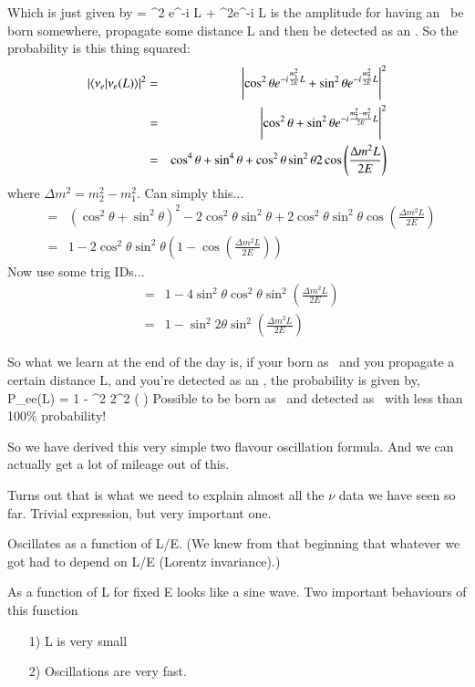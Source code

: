 {Which is just given by 
\be
{} = \cos^2 \theta e^{-i  L} + \sin^2\theta e^{-i  L} 
\ee
is the amplitude for having an \nue\ be born somewhere, propagate some distance L and then be detected as an \nue.
So the probability is this thing squared:
\begin{eqnarray*}
\left|\braket{\nu_e | \nu_e(L) }\right|^2 &=& \left|\cos^2 \theta e^{-i \frac{m_1^2}{2E} L} + \sin^2\theta e^{-i \frac{m_2^2}{2E} L} \right|^2\\
       &=& \left|\cos^2 \theta+ \sin^2\theta e^{-i \frac{m_2^2 - m_1^2}{2E} L} \right|^2\\
       &=& \cos^4 \theta+ \sin^4\theta  + \cos^2\theta \sin^2 \theta 2 \cos \left( \frac{\Delta m^2 L}{2E} \right)
\end{eqnarray*}
where $\Delta m^2 = m_2^2 - m_1^2$.
Can simply this...
\begin{eqnarray*}
 &=& \left( \cos^2 \theta + \sin^2 \theta \right)^2  - 2 \cos^2 \theta \sin^2 \theta  + 2 \cos^2 \theta \sin^2 \theta \cos \left( \frac{\Delta m^2 L}{2E} \right) \\
 &=& 1 - 2 \cos^2 \theta \sin^2 \theta \left( 1  - \cos \left( \frac{\Delta m^2 L}{2E} \right) \right)
\end{eqnarray*}
Now use some  trig IDs...
\begin{eqnarray*}
 &=& 1 - 4 \sin^2 \theta \cos^2 \theta \sin^2 \left( \frac{\Delta m^2 L}{2E} \right)\\
 &=& 1 -  \sin^2 2\theta \sin^2 \left( \frac{\Delta m^2 L}{2E} \right)
\end{eqnarray*}

So what we learn at the end of the day is, if your born as \nue\ and you propagate a certain distance L, and you're detected as an \nue, the probability is given by,
\be 
P_{ee}(L) = 1 - \sin^2 2\theta \sin^2 \left(  \right)
\ee 
Possible to be born as \nue\ and detected as \nue\ with less than 100\% probability!

So we have derived this very simple two flavour oscillation formula.
And we can actually get a lot of mileage out of this. 

Turns out that is what we need to explain almost all the $\nu$ data we have seen so far. 
Trivial expression, but very important one.

Oscillates as a function of L/E. 
(We knew from that beginning that whatever we got had to depend on L/E (Lorentz invariance).)

As a function of L for fixed E looks like a sine wave.
Two important behaviours of this function
\begin{itemize}
\item[1)] L is very small
\item[2)] Oscillations are very fast. 
\end{itemize}

}
